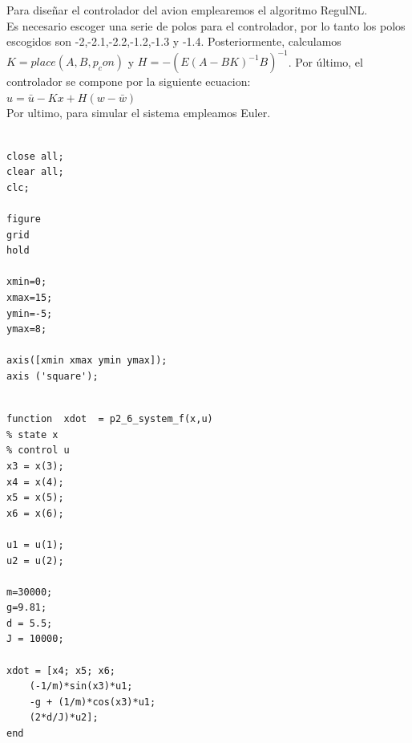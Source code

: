 \documentclass{article}
\begin{document}
\begin{itemize}
\bigskip

Para diseñar el controlador del avion emplearemos el algoritmo RegulNL.\\
Es necesario escoger una serie de polos para el controlador, por lo tanto los polos escogidos son -2,-2.1,-2.2,-1.2,-1.3 y -1.4. Posteriormente, calculamos $K = place(A,B,p_con)$ y $H = -(E(A-BK)^{-1}B)^{-1}$. Por último, el controlador se compone por la siguiente ecuacion:\\
	$u = \bar{u} - Kx + H(w - \bar{w})$\\
	
Por ultimo, para simular el sistema empleamos Euler.
\bigskip


\begin{tcolorbox}
[
title={File \texttt{answer\_6\_init.m}}   
]
\begin{scriptsize}
\begin{verbatim}

close all; 
clear all; 
clc;

figure
grid
hold

xmin=0;
xmax=15;
ymin=-5;
ymax=8;

axis([xmin xmax ymin ymax]); 
axis ('square');

\end{verbatim}
\end{scriptsize}
\end{tcolorbox}

\begin{tcolorbox}
[
title={File \texttt{answer\_6\_f.m}}      
]
\begin{scriptsize}
\begin{verbatim}

function  xdot  = p2_6_system_f(x,u)
% state x
% control u
x3 = x(3);
x4 = x(4);
x5 = x(5);
x6 = x(6);

u1 = u(1);
u2 = u(2);

m=30000;
g=9.81;
d = 5.5;
J = 10000;

xdot = [x4; x5; x6;
    (-1/m)*sin(x3)*u1;
    -g + (1/m)*cos(x3)*u1;
    (2*d/J)*u2];
end


\end{verbatim}
\end{scriptsize}
\end{tcolorbox}

\begin{tcolorbox}
[
title={File \texttt{answer\_6\_draw.m}}      
]
\begin{scriptsize}
\begin{verbatim}


\end{verbatim}
\end{scriptsize}
\end{tcolorbox}
\end{itemize}
\end{document}
